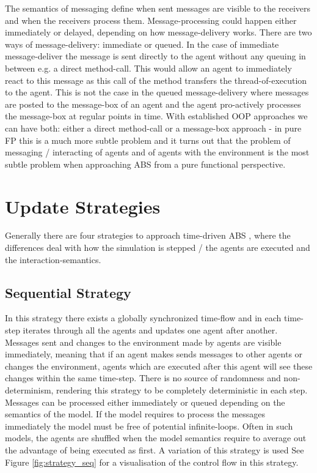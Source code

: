 The semantics of messaging define when sent messages are visible to the receivers and when the receivers process them. Message-processing could happen either immediately or delayed, depending on how message-delivery works. There are two ways of message-delivery: immediate or queued. In the case of immediate message-deliver the message is sent directly to the agent without any queuing in between e.g. a direct method-call. This would allow an agent to immediately react to this message as this call of the method transfers the thread-of-execution to the agent. This is not the case in the queued message-delivery where messages are posted to the message-box of an agent and the agent pro-actively processes the message-box at regular points in time. With established OOP approaches we can have both: either a direct method-call or a message-box approach - in pure FP this is a much more subtle problem and it turns out that the problem of messaging / interacting of agents and of agents with the environment is the most subtle problem when approaching ABS from a pure functional perspective.

\section{Update Strategies}
Generally there are four strategies to approach time-driven ABS \cite{thaler_art_2017}, where the differences deal with how the simulation is stepped / the agents are executed and the interaction-semantics.

\subsection{Sequential Strategy}
In this strategy there exists a globally synchronized time-flow and in each time-step iterates through all the agents and updates one agent after another. Messages sent and changes to the environment made by agents are visible immediately, meaning that if an agent makes sends messages to other agents or changes the environment, agents which are executed after this agent will see these changes within the same time-step. There is no source of randomness and non-determinism, rendering this strategy to be completely deterministic in each step. Messages can be processed either immediately or queued depending on the semantics of the model. If the model requires to process the messages immediately the model must be free of potential infinite-loops. Often in such models, the agents are shuffled when the model semantics require to average out the advantage of being executed as first. A variation of this strategy is used  See Figure \ref{fig:strategy_seq} for a visualisation of the control flow in this strategy.


